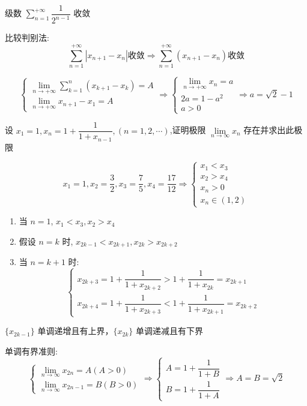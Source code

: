 \begin{solution}
\begin{anymark}[柯西列]
		级数 $\sum\limits_{n=1}^{+\infty}\dfrac{1}{2^{n-1}}$ 收敛

		比较判别法: 
		$$\sum\limits_{n=1}^{+\infty}|x_{n+1}-x_{n}|\text{收敛}\Rightarrow \sum\limits_{n=1}^{+\infty}(x_{n+1}-x_{n}) \text{收敛}$$ 
		
		$$\begin{cases}
			\lim\limits_{n\to +\infty}\sum\limits_{k=1}^{n}(x_{k+1}-x_{k}) = A\\
			\lim\limits_{n\to +\infty}x_{n+1} - x_{1} =A
		\end{cases}\Rightarrow 
		\begin{cases}
			\lim\limits_{n\to +\infty}x_{n} = a\\
			2a = 1-a^{2}\\
			a > 0
		\end{cases}\Rightarrow a = \sqrt{2} -1$$
	\end{anymark}
\end{solution}

\begin{proposition}
	设 $x_{1}=1,x_{n}=1+\dfrac{1}{1+x_{n-1}},(n=1,2,\cdots)$,证明极限 $\lim\limits_{n\to\infty}x_{n}$ 存在并求出此极限
\end{proposition}
\begin{solution}
	
	$$ x_{1}=1,x_{2}=\dfrac{3}{2},x_{3}=\dfrac{7}{5},x_{4}=\dfrac{17}{12}\Rightarrow 
	\begin{cases}
		x_{1}<x_{3} \\
		x_{2}>x_{4} \\
		x_{n} > 0\\
		x_{n}\in (1,2)
	\end{cases}$$
	\begin{enumerate}
		\item 当 $n = 1$, $x_{1} < x_{3}, x_{2} > x_{4}$
		\item 假设 $n = k$ 时, $x_{2k-1} < x_{2k+1}, x_{2k} > x_{2k+2}$
		\item 当 $n = k+1$ 时:
		$$\begin{cases}
			x_{2k+3}=1+\dfrac{1}{1+x_{2k+2}}>1+\dfrac{1}{1+x_{2k}}=x_{2k+1} \\
			x_{2k+4}=1+\dfrac{1}{1+x_{2k+3}}<1+\dfrac{1}{1+x_{2k+1}}=x_{2k+2}
		\end{cases}$$
	\end{enumerate}

	$\{x_{2k-1}\}$ 单调递增且有上界，$\{x_{2k}\}$ 单调递减且有下界
	
	单调有界准则:
	$$\begin{cases}
		\lim\limits_{n\to\infty}x_{2n} = A(A>0)\\
		\lim\limits_{n\to\infty}x_{2n-1}=B(B>0)
	\end{cases}\Rightarrow 
	\begin{cases}
		A=1+\dfrac{1}{1+B}\\
		B=1+\dfrac{1}{1+A}
	\end{cases}\Rightarrow A=B=\sqrt{2}$$
\end{solution}


